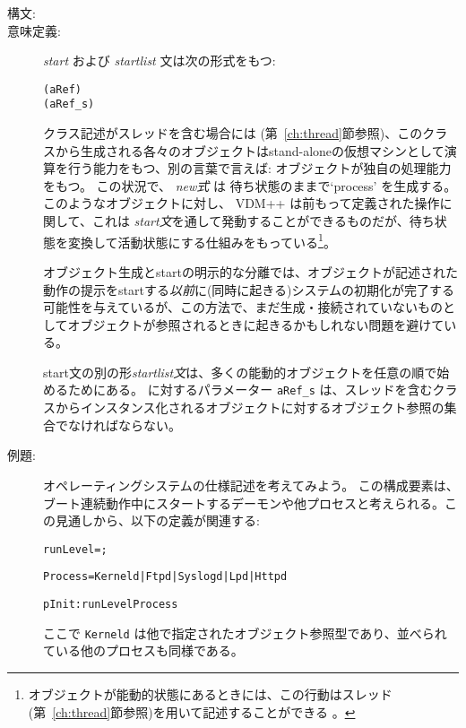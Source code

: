 \documentclass[\pformat,12pt]{jarticle}
\newcommand{\vdmpp}{VDM++}
\begin{document}
\begin{description}
\item[構文:] 


    
\item[意味定義:] {\it start} および {\it startlist} 文は次の形式をもつ:
  \begin{alltt}
    (aRef)
    (aRef_s)
  \end{alltt}

クラス記述がスレッドを含む場合には (第~\ref{ch:thread}節参照)、このクラスから生成される各々のオブジェクトはstand-aloneの仮想マシンとして演算を行う能力をもつ、別の言葉で言えば: オブジェクトが独自の処理能力をもつ。
この状況で、 {\it new式} は 待ち状態のままで`process' を生成する。 
 このようなオブジェクトに対し、 {\vdmpp} は前もって定義された操作に関して、これは {\it start文}を通して発動することができるものだが、待ち状態を変換して活動状態にする仕組みをもっている\footnote{オブジェクトが能動的状態にあるときには、この行動はスレッド(第~\ref{ch:thread}節参照)を用いて記述することができる 。}。

オブジェクト生成とstartの明示的な分離では、オブジェクトが記述された動作の提示をstartする{\it 以前}に(同時に起きる)システムの初期化が完了する可能性を与えているが、この方法で、まだ生成・接続されていないものとしてオブジェクトが参照されるときに起きるかもしれない問題を避けている。

start文の別の形{\it startlist文}は、多くの能動的オブジェクトを任意の順で始めるためにある。
 に対するパラメーター {\tt aRef\_s} は、スレッドを含むクラスからインスタンス化されるオブジェクトに対するオブジェクト参照の集合でなければならない。

\item[例題:] 
オペレーティングシステムの仕様記述を考えてみよう。
この構成要素は、ブート連続動作中にスタートするデーモンや他プロセスと考えられる。この見通しから、以下の定義が関連する:
\begin{alltt}

    runLevel = ;

    Process = Kerneld | Ftpd | Syslogd | Lpd | Httpd

    pInit :  runLevel  Process
\end{alltt}
ここで \texttt{Kerneld} は他で指定されたオブジェクト参照型であり、並べられている他のプロセスも同様である。


\end{description}
\end{document}

